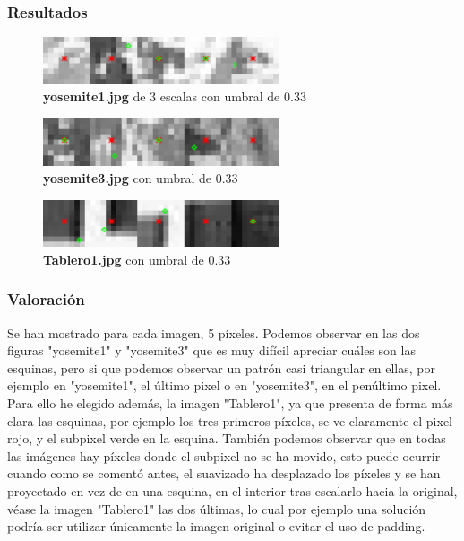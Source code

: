 \documentclass{article}
\begin{document}
\newpage
\subsubsection{Resultados}

\begin{figure}[hbt!]
	\centering
	\includegraphics[width=0.62\textwidth]{../assets/Ejercicio1-Subpixel.png}
	\caption{\textbf{yosemite1.jpg} de 3 escalas con umbral de 0.33}
\end{figure}

\begin{figure}[hbt!]
	\centering
	\includegraphics[width=0.62\textwidth]{../assets/Ejercicio1-Subpixel-2.png}
	\caption{\textbf{yosemite3.jpg} con umbral de 0.33}
\end{figure}

\begin{figure}[hbt!]
	\centering
	\includegraphics[width=0.62\textwidth]{../assets/Ejercicio1-Subpixel-3.png}
	\caption{\textbf{Tablero1.jpg} con umbral de 0.33}
\end{figure}

\subsubsection{Valoración}
Se han mostrado para cada imagen, 5 píxeles. Podemos observar en las dos figuras "yosemite1" y "yosemite3" que es muy difícil apreciar cuáles son las esquinas, pero si que podemos observar un patrón casi triangular en ellas, por ejemplo en "yosemite1", el último pixel o en "yosemite3", en el penúltimo pixel.
\newline
Para ello he elegido además, la imagen "Tablero1", ya que presenta de forma más clara las esquinas, por ejemplo los tres primeros píxeles, se ve claramente el pixel rojo, y el subpixel verde en la esquina.
\newline\newline
También podemos observar que en todas las imágenes hay píxeles donde el subpixel no se ha movido, esto puede ocurrir cuando como se comentó antes, el suavizado ha desplazado los píxeles y se han proyectado en vez de en una esquina, en el interior tras escalarlo hacia la original, véase la imagen "Tablero1" las dos últimas, lo cual por ejemplo una solución podría ser utilizar únicamente la imagen original o evitar el uso de padding.
\end{document}
